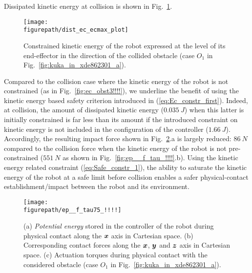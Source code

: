 Dissipated kinetic energy at collision is shown in Fig.~\ref{fig:dist_ec_ecmax_plot}.
\begin{figure}[!htbp]
\centering
{\texttt{[image: \\figurepath/dist\_ec\_ecmax\_plot]}}
\caption{Constrained kinetic energy of the robot expressed at the level of its end-effector in the direction of the collided obstacle (case $O_1$ in Fig.~\ref{fig:kuka_in_xde862301_a}).} 
\label{fig:dist_ec_ecmax_plot}
\end{figure}
Compared to the collision case where the kinetic energy of the robot is not constrained (as in Fig.~\ref{fig:ec_obst3!!!!}), we underline the benefit of using the kinetic energy based safety criterion introduced in (\ref{eq:Ec_constr_first}). Indeed, at collision, the amount of dissipated kinetic energy ($0.035~J$) when this latter is initially constrained is far less than its amount if the introduced constraint on kinetic energy is not included in the configuration of the controller ($1.66~J$). Accordingly,
the resulting impact force shown in Fig.~\ref{fig:ep__f_tau75_!!!!}.a is largely reduced: $86~N$ compared to the collision force when the kinetic energy of the robot is not pre-constrained ($551~N$ as shown in Fig.~\ref{fig:ep__f_tau_!!!!}.b). Using the kinetic energy related constraint (\ref{eq:Safe_constr_1}), the ability to saturate the kinetic energy of the robot at a safe limit before collision enables a safer physical-contact establishment/impact between the robot and its environment. \\
 \begin{figure}[!htbp]
\centering
{\texttt{[image: \\figurepath/ep\_\_f\_tau75\_!!!!]}}
\caption{(a) \textit{Potential energy} stored in the controller of the robot during physical contact along the $\mbox{\boldmath${x}$}$ axis in Cartesian space. (b) Corresponding contact forces along the $\mbox{\boldmath${x}$}$, $\mbox{\boldmath${y}$}$ and $\mbox{\boldmath${z}$}$ axis in Cartesian space. (c) Actuation torques during physical contact with the considered obstacle (case $O_1$ in Fig.~\ref{fig:kuka_in_xde862301_a}).} 
\label{fig:ep__f_tau75_!!!!}
\end{figure}
